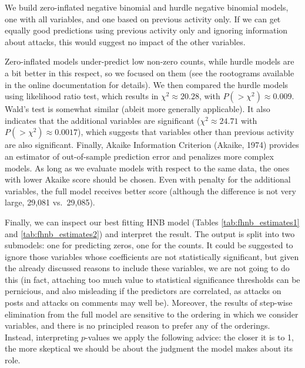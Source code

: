 \documentclass[10pt,dvipsnames]{scrartcl}
\begin{document}
\normalsize

We build zero-inflated negative binomial and hurdle negative binomial
models, one with all variables, and one based on previous activity only.
If we can get equally good predictions using previous activity only and
ignoring information about attacks, this would suggest no impact of the
other variables.

\footnotesize 

\normalsize

Zero-inflated models under-predict low non-zero counts, while hurdle
models are a bit better in this respect, so we focused on them (see the
rootograms available in the online documentation for details). We then
compared the hurdle models using likelihood ratio test, which results in
\(\chi^2 \approx 20.28\), with \(P(>\chi^2)\approx 0.009\). Wald's test
is somewhat similar (ableit more generally applicable). It also
indicates that the additional variables are significant
(\(\chi^2 \approx 24.71\) with \(P(>\chi^2)\approx 0.0017\)), which
suggests that variables other than previous activity are also
significant. Finally, Akaike Information Criterion (Akaike, 1974)
provides an estimator of out-of-sample prediction error and penalizes
more complex models. As long as we evaluate models with respect to the
same data, the ones with lower Akaike score should be chosen. Even with
penalty for the additional variables, the full model receives better
score (although the difference is not very large, 29,081 vs.~29,085).

Finally, we can inspect our best fitting HNB model (Tables
\ref{tab:fhnb_estimates1} and \ref{tab:fhnb_estimates2}) and interpret
the result. The output is split into two submodels: one for predicting
zeros, one for the counts. It could be suggested to ignore those
variables whose coefficients are not statistically significant, but
given the already discussed reasons to include these variables, we are
not going to do this (in fact, attaching too much value to statistical
significance thresholds can be pernicious, and also misleading if the
predictors are correlated, as attacks on posts and attacks on comments
may well be). Moreover, the results of step-wise elimination from the
full model are sensitive to the ordering in which we consider variables,
and there is no principled reason to prefer any of the orderings.
Instead, interpreting \(p\)-values we apply the following advice: the
closer it is to 1, the more skeptical we should be about the judgment
the model makes about its role.
\end{document}
